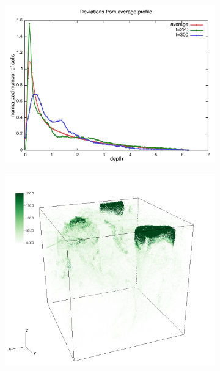 \begin{figure}[ht]  
    \begin{subfigure}[b]{0.68\textwidth}
        \includegraphics[width=\textwidth]{data/3D_model/run2/profile_deviation}
        \caption{}
        \label{fig:lag_res_prof_deviation_profile}
    \end{subfigure}
    \begin{subfigure}[b]{0.3\textwidth}
        \begin{minipage}[t]{\linewidth}
        \includegraphics[width=\textwidth]{data/3D_model/run2/positions_110_coloured}

\end{minipage}
\end{subfigure}
\end{figure}
